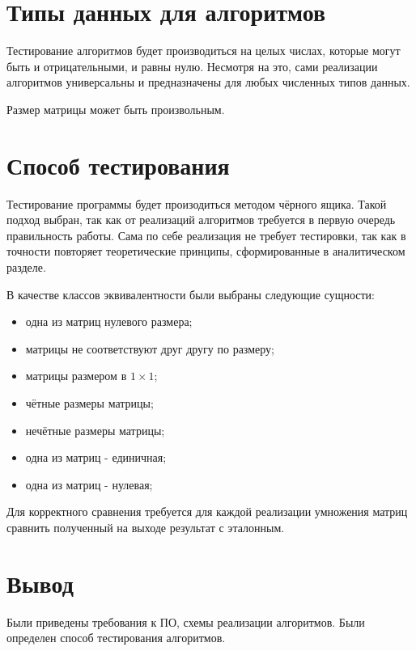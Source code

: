 \section{Типы данных для алгоритмов}
Тестирование алгоритмов будет производиться на целых числах, 
которые могут быть и отрицательными, и равны нулю. Несмотря на это,
сами реализации алгоритмов универсальны и предназначены для любых численных типов данных.

Размер матрицы может быть произвольным.

\section{Способ тестирования}
Тестирование программы будет произодиться методом чёрного ящика.
Такой подход выбран, так как от реализаций алгоритмов требуется в первую
очередь правильность работы.
Сама по себе реализация не требует тестировки, так как в точности
повторяет теоретические принципы, сформированные в аналитическом
разделе.

В качестве классов эквивалентности были выбраны следующие сущности:
\begin{itemize}
	\item одна из матриц нулевого размера;
	\item матрицы не соответствуют друг другу по размеру;
	\item матрицы размером в $1 \times 1$;
	\item чётные размеры матрицы;
	\item нечётные размеры матрицы;
	\item одна из матриц - единичная;
	\item одна из матриц - нулевая;
\end{itemize}

Для корректного сравнения требуется для каждой реализации умножения матриц
сравнить полученный на выходе результат с эталонным.

\section{Вывод}
Были приведены требования к ПО, схемы реализации алгоритмов.
Были определен способ тестирования алгоритмов.